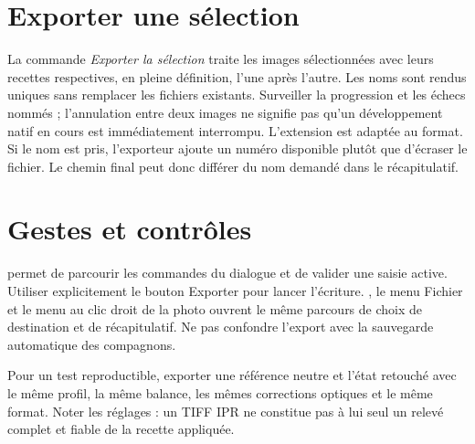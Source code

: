\section{Exporter une sélection}
La commande \emph{Exporter la sélection} traite les images sélectionnées
avec leurs recettes respectives, en pleine définition, l'une après l'autre.
Les noms sont rendus uniques sans remplacer les fichiers existants.
Surveiller la progression et les échecs nommés ; l'annulation entre deux images
ne signifie pas qu'un développement natif en cours est immédiatement interrompu.
L’extension est adaptée au format. Si le nom est pris, l’exporteur ajoute
un numéro disponible plutôt que d’écraser le fichier. Le chemin final peut
donc différer du nom demandé dans le récapitulatif.


\section{Gestes et contrôles}
 permet de parcourir les commandes du dialogue et 
de valider une saisie active. Utiliser explicitement le bouton Exporter pour
lancer l’écriture. , le menu Fichier et le menu au clic droit
de la photo ouvrent le même parcours de choix de destination et de récapitulatif.
Ne pas confondre l’export avec la sauvegarde automatique des compagnons.

Pour un test reproductible, exporter une référence neutre et l’état retouché
avec le même profil, la même balance, les mêmes corrections optiques et le
même format. Noter les réglages : un TIFF IPR ne constitue pas à lui seul
un relevé complet et fiable de la recette appliquée.
